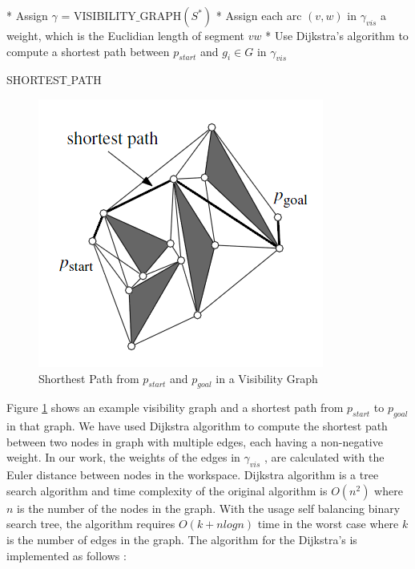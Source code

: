 \begin{algorithm}[H]
* Assign $\gamma$ = VISIBILITY$\_$GRAPH$(S^*)$ \newline
* Assign each arc $(v,w)$ in $\gamma_{vis}$ a weight, which is the Euclidian length of segment $vw$ \newline
{}
{
* Use Dijkstra's algorithm to compute a shortest path between $p_{start}$ and $g_i \in G$ in $\gamma_{vis}$
}
\caption{SHORTEST$\_$PATH}
\end{algorithm}
  
\vspace{2cm}

\begin{figure}[H]
\caption{Shorthest Path from $p_{start}$ and $p_{goal}$ in a Visibility Graph \cite{92}} \label{dijksttae_visibility}
\centering
\includegraphics[scale = 0.9]{shortest}
\end{figure} 

Figure \ref{dijksttae_visibility} shows an example visibility graph and a shortest path from $p_{start}$ to $p_{goal}$ in that graph. We have used Dijkstra algorithm to compute the shortest path between two nodes in graph with multiple edges, each having a non-negative weight. In our work, the weights of the edges in $\gamma_{vis}$ , are calculated with the Euler distance between nodes in the workspace.
Dijkstra algorithm is a tree search algorithm and time complexity of the original algorithm is $O(n^2)$ where $n$ is the number of the nodes in the graph. With the usage self balancing binary search tree, the algorithm requires $O(k+nlogn)$ time in the worst case where $k$ is the number of edges in the graph. The algorithm for the Dijkstra's is implemented as follows \cite{92}:
\newpage
	
